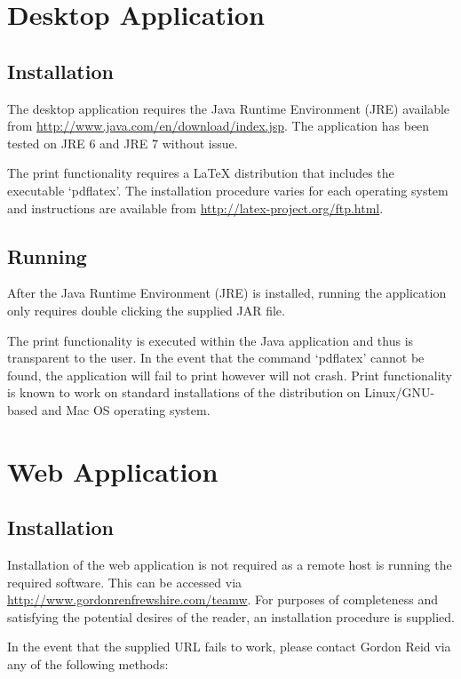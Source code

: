\section{Desktop Application}

\subsection{Installation}

The desktop application requires the Java Runtime Environment (JRE) available 
from \url{http://www.java.com/en/download/index.jsp}. The application has been 
tested on JRE 6 and JRE 7 without issue.

The print functionality requires a LaTeX distribution that includes the
executable `pdflatex'. The installation procedure varies for each operating
system and instructions are available from
\url{http://latex-project.org/ftp.html}.

\subsection{Running}

After the Java Runtime Environment (JRE) is installed, running the application
only requires double clicking the supplied JAR file.

The print functionality is executed within the Java application and thus is
transparent to the user. In the event that the command `pdflatex' cannot be
found, the application will fail to print however will not crash. Print
functionality is known to work on standard installations of the distribution
on Linux/GNU-based and Mac OS operating system.

\section{Web Application}

\subsection{Installation}

Installation of the web application is not required as a remote host is running
the required software. This can be accessed via 
\url{http://www.gordonrenfrewshire.com/teamw}. For purposes of completeness
and satisfying the potential desires of the reader, an installation procedure
is supplied.

In the event that the supplied URL fails to work, please contact Gordon Reid
via any of the following methods:

